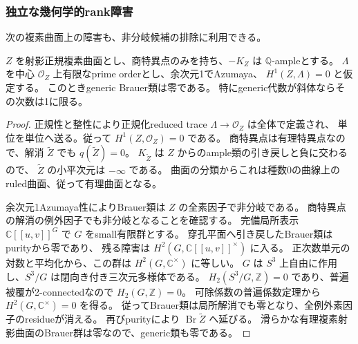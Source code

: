 \subsubsection{独立な幾何学的rank障害}
次の複素曲面上の障害も、非分岐候補の排除に利用できる。
\begin{lemma}[非分岐orderのrank障害]
\label{lem:unramified-delpezzo-rank}
$Z$ を射影正規複素曲面とし、商特異点のみを持ち、$-K_Z$ は $\mathbb Q$-ampleとする。
$\Lambda$ を中心 $\mathcal O_Z$ 上有限なprime orderとし、余次元1でAzumaya、
$H^1(Z,\Lambda)=0$ と仮定する。
このときgeneric Brauer類は零である。
特にgeneric代数が斜体ならその次数は1に限る。
\end{lemma}
\begin{proof}
正規性と整性により正規化reduced trace $\Lambda\to\mathcal O_Z$ は全体で定義され、
単位を単位へ送る。従って $H^1(Z,\mathcal O_Z)=0$ である。
商特異点は有理特異点なので、解消 $\widetilde Z$ でも $q(\widetilde Z)=0$。
$K_{\widetilde Z}$ は $Z$ からのample類の引き戻しと負に交わるので、
$\widetilde Z$ の小平次元は $-\infty$ である。
曲面の分類からこれは種数0の曲線上のruled曲面、従って有理曲面となる。

余次元1Azumaya性によりBrauer類は $Z$ の全素因子で非分岐である。
商特異点の解消の例外因子でも非分岐となることを確認する。
完備局所表示 $\mathbb C[[u,v]]^G$ で $G$ をsmall有限群とする。
穿孔平面へ引き戻したBrauer類はpurityから零であり、
残る障害は $H^2(G,\mathbb C[[u,v]]^\times)$ に入る。
正次数単元の対数と平均化から、この群は $H^2(G,\mathbb C^\times)$ に等しい。
$G$ は $S^3$ 上自由に作用し、$S^3/G$ は閉向き付き三次元多様体である。
$H_2(S^3/G,\mathbb Z)=0$ であり、普遍被覆が2-connectedなので
$H_2(G,\mathbb Z)=0$。
可除係数の普遍係数定理から $H^2(G,\mathbb C^\times)=0$ を得る。
従ってBrauer類は局所解消でも零となり、全例外素因子のresidueが消える。
再びpurityにより $\operatorname{Br}\widetilde Z$ へ延びる。
滑らかな有理複素射影曲面のBrauer群は零なので、generic類も零である。
\end{proof}

